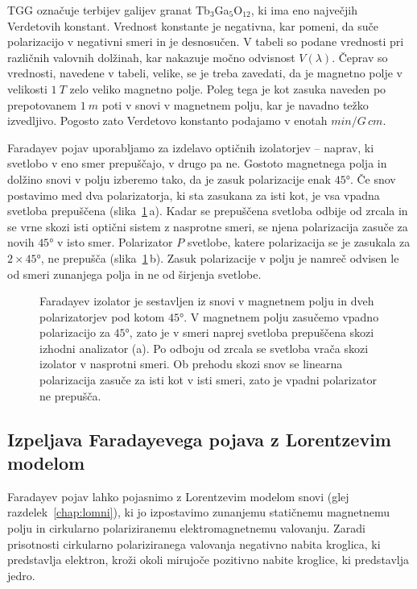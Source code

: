 TGG označuje terbijev galijev granat Tb$_3$Ga$_5$O$_{12}$, ki ima eno največjih Verdetovih konstant.
Vrednost konstante je negativna, kar pomeni, da suče polarizacijo v negativni smeri in je 
desnosučen. V tabeli so podane vrednosti pri različnih valovnih dolžinah, kar nakazuje močno
odvisnost $V(\lambda)$. Čeprav so vrednosti, navedene v tabeli, velike, 
se je treba zavedati, da je magnetno polje v velikosti $1~\si{T}$
zelo veliko magnetno polje. Poleg tega je kot zasuka naveden po prepotovanem $1~\si{m}$ poti v snovi 
v magnetnem polju, kar je navadno težko izvedljivo. Pogosto zato Verdetovo konstanto
podajamo v enotah $\si{min}/\si{G\,cm}$. 

Faradayev pojav uporabljamo za izdelavo optičnih izolatorjev -- naprav, ki svetlobo
v eno smer prepuščajo, v drugo pa ne. Gostoto magnetnega polja in dolžino snovi v polju 
izberemo tako, da je zasuk polarizacije enak $45\si{\degree}$. Če snov postavimo med dva 
polarizatorja, ki sta zasukana za isti kot, je vsa vpadna svetloba prepuščena 
(slika~\ref{fig:09_izolator}\,a). Kadar se prepuščena svetloba odbije od zrcala in se vrne
skozi isti optični sistem z nasprotne smeri, se njena polarizacija zasuče za novih $45\si{\degree}$
v isto smer. Polarizator $P$ svetlobe, katere polarizacija se je zasukala za
 $2 \times 45\si{\degree}$, ne prepušča (slika~\ref{fig:09_izolator}\,b). Zasuk
polarizacije v polju je namreč odvisen le od smeri zunanjega polja in ne od širjenja
svetlobe. 

\begin{figure}[ht]
\centering
\def\svgwidth{100truemm} 

\caption{Faradayev izolator je sestavljen iz snovi v magnetnem polju 
in dveh polarizatorjev pod kotom $45\si{\degree}$. V magnetnem polju zasučemo 
vpadno polarizacijo za $45\si{\degree}$, zato je v smeri naprej 
svetloba prepuščena skozi izhodni analizator (a). Po odboju od zrcala se
svetloba vrača skozi izolator v nasprotni smeri. Ob prehodu skozi snov se
linearna polarizacija zasuče za isti kot v isti smeri, zato je vpadni polarizator ne prepušča.}
\label{fig:09_izolator}
\end{figure}

\subsection*{Izpeljava Faradayevega pojava z Lorentzevim modelom}
Faradayev pojav lahko pojasnimo z Lorentzevim modelom snovi 
(glej razdelek~\ref{chap:lomni}), ki jo izpostavimo zunanjemu 
statičnemu magnetnemu polju in cirkularno polariziranemu
elektro\-magnetnemu valovanju. Zaradi prisotnosti cirkularno 
polariziranega valovanja negativno nabita kroglica, ki predstavlja elektron, 
kroži okoli mirujoče pozitivno nabite kroglice, ki predstavlja jedro. 

